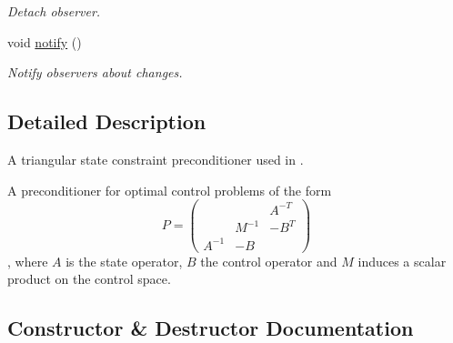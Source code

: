 \begin{DoxyCompactItemize}
\begin{DoxyCompactList}\small\item\em Detach observer. \end{DoxyCompactList}\item 
\hypertarget{classSpacy_1_1Mixin_1_1MixinConnection_a1ddeaa78a3bb4a38c2cca36d1f99fe36}{}void \hyperlink{classSpacy_1_1Mixin_1_1MixinConnection_a1ddeaa78a3bb4a38c2cca36d1f99fe36}{notify} ()\label{classSpacy_1_1Mixin_1_1MixinConnection_a1ddeaa78a3bb4a38c2cca36d1f99fe36}

\begin{DoxyCompactList}\small\item\em Notify observers about changes. \end{DoxyCompactList}\end{DoxyCompactItemize}


\subsection{Detailed Description}
A triangular state constraint preconditioner used in \cite{Lubkoll2015a}. 

A preconditioner for optimal control problems of the form \[ P=\left( \begin{array}{ccc} & & A^{-T} \\ & M^{-1} & -B^T \\ A^{-1} & -B & \end{array} \right)\], where $A$ is the state operator, $B$ the control operator and $M$ induces a scalar product on the control space. 

\subsection{Constructor \& Destructor Documentation}
\hypertarget{classSpacy_1_1CG_1_1TriangularStateConstraintPreconditioner_a8bbfa8bf7bdfcd3c308d4dbec8c448d0}{}

